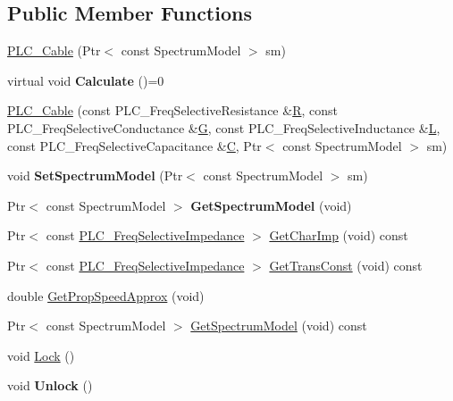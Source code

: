 \subsection*{\-Public \-Member \-Functions}
\begin{DoxyCompactItemize}
\item 
\hyperlink{classns3_1_1PLC__Cable_ac833486bec03f0903a38e9627aaeadd8}{\-P\-L\-C\-\_\-\-Cable} (\-Ptr$<$ const \-Spectrum\-Model $>$ sm)
\item 
\hypertarget{classns3_1_1PLC__Cable_aa3349d90698a3705e3b64d54dc16464b}{virtual void {\bfseries \-Calculate} ()=0}\label{classns3_1_1PLC__Cable_aa3349d90698a3705e3b64d54dc16464b}

\item 
\hyperlink{classns3_1_1PLC__Cable_a732d4298d2e5a93d5265666b98fdd341}{\-P\-L\-C\-\_\-\-Cable} (const \-P\-L\-C\-\_\-\-Freq\-Selective\-Resistance \&\hyperlink{classns3_1_1PLC__Cable_a1770f66065636bde27fa4d8e35c8a534}{\-R}, const \-P\-L\-C\-\_\-\-Freq\-Selective\-Conductance \&\hyperlink{classns3_1_1PLC__Cable_af2c7882c896e9bc7f98121f7a3f25b53}{\-G}, const \-P\-L\-C\-\_\-\-Freq\-Selective\-Inductance \&\hyperlink{classns3_1_1PLC__Cable_a721d49ba4225f914d773d085c2d1f911}{\-L}, const \-P\-L\-C\-\_\-\-Freq\-Selective\-Capacitance \&\hyperlink{classns3_1_1PLC__Cable_a2443b8723d75123547011498d535fe48}{\-C}, \-Ptr$<$ const \-Spectrum\-Model $>$ sm)
\item 
\hypertarget{classns3_1_1PLC__Cable_a11cb52ebc04740af19c7fae83a7cb349}{void {\bfseries \-Set\-Spectrum\-Model} (\-Ptr$<$ const \-Spectrum\-Model $>$ sm)}\label{classns3_1_1PLC__Cable_a11cb52ebc04740af19c7fae83a7cb349}

\item 
\hypertarget{classns3_1_1PLC__Cable_ad47ce5cbdbf719822706e34b8cce11ec}{\-Ptr$<$ const \-Spectrum\-Model $>$ {\bfseries \-Get\-Spectrum\-Model} (void)}\label{classns3_1_1PLC__Cable_ad47ce5cbdbf719822706e34b8cce11ec}

\item 
\-Ptr$<$ const \*
\hyperlink{classns3_1_1PLC__FreqSelectiveValue}{\-P\-L\-C\-\_\-\-Freq\-Selective\-Impedance} $>$ \hyperlink{classns3_1_1PLC__Cable_a69891ab8cc93ca879bcdb45c3186c37e}{\-Get\-Char\-Imp} (void) const 
\item 
\-Ptr$<$ const \*
\hyperlink{classns3_1_1PLC__FreqSelectiveValue}{\-P\-L\-C\-\_\-\-Freq\-Selective\-Impedance} $>$ \hyperlink{classns3_1_1PLC__Cable_afbb84efd3e13af6c5bc0f937045e1580}{\-Get\-Trans\-Const} (void) const 
\item 
double \hyperlink{classns3_1_1PLC__Cable_a2261f8fa8054aadacbf274ac440f26bd}{\-Get\-Prop\-Speed\-Approx} (void)
\item 
\-Ptr$<$ const \-Spectrum\-Model $>$ \hyperlink{classns3_1_1PLC__Cable_a0cae55f20d768e2aba32af7bb4afb18a}{\-Get\-Spectrum\-Model} (void) const 
\item 
void \hyperlink{classns3_1_1PLC__Cable_a684124d04e51bb5129a40eb91acd9325}{\-Lock} ()
\item 
\hypertarget{classns3_1_1PLC__Cable_ae159d0b279ae1701b9e209e62fe37d40}{void {\bfseries \-Unlock} ()}\label{classns3_1_1PLC__Cable_ae159d0b279ae1701b9e209e62fe37d40}


\end{DoxyCompactItemize}
